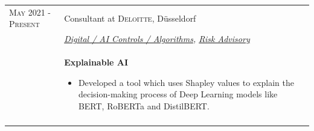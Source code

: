 \documentclass[a4paper,10pt]{article} %
\begin{document}
\begin{longtable}{l p{11cm}}
\textsc{May 2021 - Present} & Consultant at \textsc{Deloitte}, Düsseldorf\\
& \emph{\href{https://www2.deloitte.com/de/de/pages/risk/solutions/digital-ai-controls-and-algorithms.html}{Digital / AI Controls / Algorithms}, \href{https://www2.deloitte.com/de/de/services/risk.html?icid=bottom_risk}{Risk Advisory}}\\[1mm]
& \textbf{\footnotesize{Explainable AI}}\vspace{0.2em}
  {\footnotesize
  	\begin{itemize}
  		\setlength\itemsep{0.2em}
 		\item Developed a tool which uses Shapley values to explain the decision-making process of Deep Learning models like BERT, RoBERTa and DistilBERT.      
  \end{itemize}
  }
\\
\multicolumn{2}{c}{} \\[-1.5em]



\end{longtable}
\end{document}
